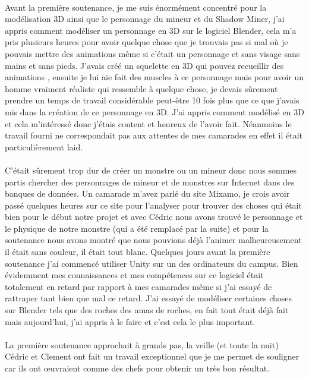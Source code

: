 \documentclass[titlepage, 13px, a4paper]{report}
\begin{document}
\paragraph{} \hspace{0pt}
Avant la première soutenance, je me suis énormément concentré pour la modélisation 3D ainsi que le personnage 
du mineur et du Shadow Miner, j’ai appris comment modéliser un personnage en 3D sur le logiciel Blender, 
cela m’a pris plusieurs heures pour avoir quelque chose que je trouvais pas si mal où je pouvais mettre 
des animations même si c’était un personnage et sans visage sans mains et sans pieds. J’avais créé un squelette 
en 3D qui pouvez recueillir des animations , ensuite je lui aie fait des muscles à ce personnage mais pour 
avoir un homme vraiment réaliste qui ressemble à quelque chose, je devais sûrement prendre un temps de travail 
considérable peut-être 10 fois plus que ce que j’avais mis dans la création de ce personnage en 3D. 
J’ai appris comment modélisé en 3D et cela m’intéressé donc j’étais content et heureux de l’avoir fait. 
Néanmoins le travail fourni ne correspondait pas aux attentes de mes camarades en effet il était particulièrement 
laid. \\ \\
C’était sûrement trop dur de créer un monstre 
ou un mineur donc nous sommes partis chercher des personnages de mineur et de monstres sur Internet dans des 
banques de données. Un camarade m’avez parlé du site Mixamo, je crois avoir passé quelques heures sur ce site 
pour l’analyser pour trouver des choses qui était bien pour le début notre projet et avec Cédric nous avons 
trouvé le personnage et le physique de notre monstre (qui a été remplacé par la suite) et pour la soutenance nous 
avons montré que nous pouvions déjà l’animer malheureusement il était sans couleur, il était tout blanc. 
Quelques jours avant la première soutenance j’ai commencé utiliser Unity sur un des ordinateurs du campus. 
Bien évidemment mes connaissances et mes compétences sur ce logiciel était totalement en retard par rapport à mes 
camarades même si j’ai essayé de rattraper tant bien que mal ce retard. J’ai essayé de modéliser certaines 
choses sur Blender tels que des roches des amas de roches, en fait tout était déjà fait mais aujourd’hui, 
j’ai appris à le faire et c’est cela le plus important. \\ \\
La première soutenance approchait à grands pas, 
la veille (et toute la nuit) Cédric et Clement ont fait un travail exceptionnel que je me permet de souligner car ils ont œuvraient 
comme des chefs pour obtenir un très bon résultat. \\
\end{document}
